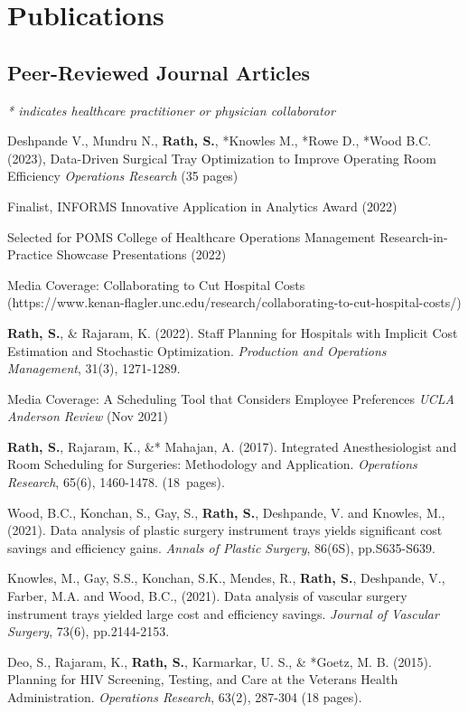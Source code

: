 \documentclass[11pt,a4paper]{article}
\renewenvironment{itemize}{
	\begin{list}{}{
			\setlength{\leftmargin}{1.5em}
		}
	}{
\end{list}
}
\begin{document}
	\section*{\textbf{Publications}}

	\subsection*{Peer-Reviewed Journal Articles}
	
	\emph{* indicates healthcare practitioner or physician collaborator}

	\begin{itemize}
			\item Deshpande V., Mundru N., \textbf{Rath, S.}, *Knowles M., *Rowe D., *Wood B.C. (2023),  Data-Driven Surgical Tray Optimization to Improve Operating Room Efficiency \emph{Operations Research} (35 pages)
		\begin{itemize}
			\item[\textendash] {Finalist}, INFORMS Innovative Application in Analytics Award (2022)
			\item[\textendash] Selected for POMS College of Healthcare Operations Management Research-in-Practice Showcase Presentations (2022)
			\item[\textendash] Media Coverage: Collaborating to Cut Hospital Costs\\ (https://www.kenan-flagler.unc.edu/research/collaborating-to-cut-hospital-costs/)
		\end{itemize}
		
		\item \textbf{Rath, S.}, \& Rajaram, K. (2022). Staff Planning for Hospitals with Implicit Cost Estimation and Stochastic Optimization. \emph{Production and Operations Management}, 31(3), 1271-1289.
		\begin{itemize}
			\item[\textendash] Media Coverage: A Scheduling Tool that Considers Employee Preferences \emph{UCLA Anderson Review} (Nov 2021)
		\end{itemize}
		\item \textbf{Rath, S.}, Rajaram, K., \&* Mahajan, A. (2017). Integrated Anesthesiologist and Room Scheduling for Surgeries: Methodology and Application. \emph{Operations Research}, 65(6), 1460-1478. \mbox{(18 pages)}.
		\item Wood, B.C., Konchan, S., Gay, S., \textbf{Rath, S.}, Deshpande, V. and Knowles, M., (2021). Data analysis of plastic surgery instrument trays yields significant cost savings and efficiency gains. \emph{Annals of Plastic Surgery}, 86(6S), pp.S635-S639.
		\item Knowles, M., Gay, S.S., Konchan, S.K., Mendes, R., \textbf{Rath, S.}, Deshpande, V., Farber, M.A. and Wood, B.C., (2021). Data analysis of vascular surgery instrument trays yielded large cost and efficiency savings. \emph{Journal of Vascular Surgery}, 73(6), pp.2144-2153.
		\item Deo, S., Rajaram, K., \textbf{Rath, S.}, Karmarkar, U. S., \& *Goetz, M. B. (2015). Planning for HIV Screening, Testing, and Care at the Veterans Health Administration. \emph{Operations Research}, 63(2), 287-304 (18 pages).
	\end{itemize}
\end{document}
